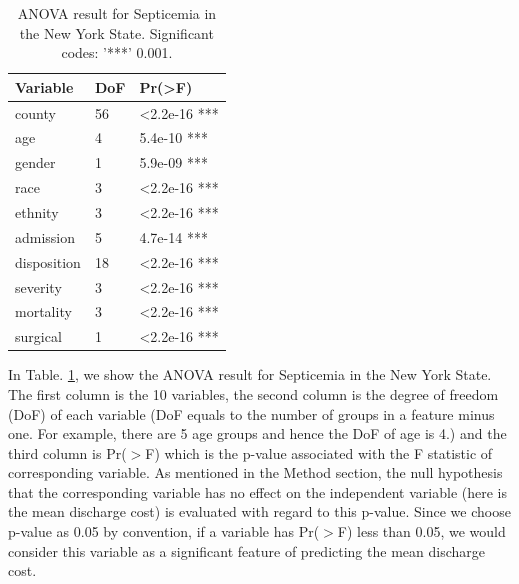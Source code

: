 \documentclass[10pt,twocolumn,letterpaper]{article}
\begin{document}
\begin{table}[]
\small
\begin{center}
\label{anova}
\begin{tabular}{|l|l|l|}
\hline
\textbf{Variable} & \textbf{DoF} & \textbf{Pr(\textgreater{}F)} \\ \hline
county            & 56           & \textless{}2.2e-16 ***       \\ \hline
age               & 4            & 5.4e-10 ***                  \\ \hline
gender            & 1            & 5.9e-09 ***                  \\ \hline
race              & 3            & \textless{}2.2e-16 ***       \\ \hline
ethnity           & 3            & \textless{}2.2e-16 ***       \\ \hline
admission         & 5            & 4.7e-14 ***                  \\ \hline
disposition       & 18           & \textless{}2.2e-16 ***       \\ \hline
severity          & 3            & \textless{}2.2e-16 ***       \\ \hline
mortality         & 3            & \textless{}2.2e-16 ***       \\ \hline
surgical          & 1            & \textless{}2.2e-16 ***       \\ \hline
\end{tabular}
\end{center}
\caption{ANOVA result for Septicemia in the New York State. Significant codes: '***' 0.001.}
\end{table}
In Table. \ref{anova}, we show the ANOVA result for Septicemia in the New York State. The first column is the 10 variables, the second column is the degree of freedom (DoF) of each variable (DoF equals to the number of groups in a feature minus one. For example, there are 5 age groups and hence the DoF of age is 4.) and the third column is Pr($>$F) which is the p-value associated with the F statistic of corresponding variable. As mentioned in the Method section, the null hypothesis that the corresponding variable has no effect on the independent variable (here is the mean discharge cost) is evaluated with regard to this p-value. Since we choose p-value as 0.05 by convention, if a variable has Pr($>$F) less than 0.05, we would consider this variable as a significant feature of predicting the mean discharge cost. 
\end{document}
